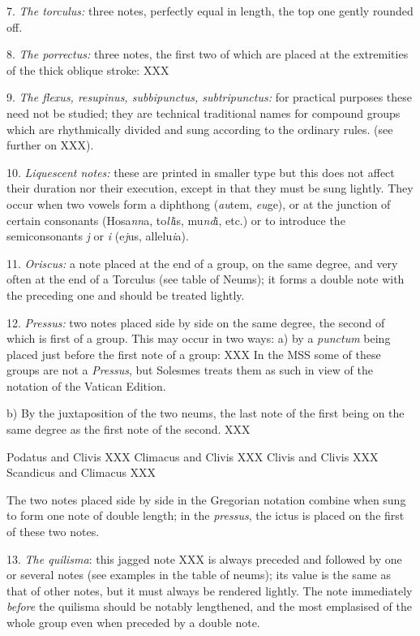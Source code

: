 7. {\it The torculus:} three notes, perfectly equal in length, the top one gently rounded off.

8. {\it The porrectus:} three notes, the first two of which are placed at the extremities of the thick oblique stroke:
XXX

9. {\it The flexus, resupinus, subbipunctus, subtripunctus:} for practical purposes these need not be studied; they are technical traditional names for compound groups which are rhythmically divided and sung according to the ordinary rules. (see further on XXX).

10. {\it Liquescent notes:} these are printed in smaller type but this does not affect their duration nor their execution, except in that they must be sung lightly. They occur when two vowels form a diphthong ({\it au}tem, {\it eu}ge), or at the junction of certain consonants (Hosa{\it nn}a, to{\it ll}is, mu{\it nd}i, etc.) or to introduce the semiconsonants {\it j} or {\it i} (e{\it j}us, allelu{\it i}a).

11. {\it Oriscus:} a note placed at the end of a group, on the same degree, and very often at the end of a Torculus (see table of Neums); it forms a double note with the preceding one and should be treated lightly.

12. {\it Pressus:} two notes placed side by side on the same degree, the second of which is first of a group. This may occur in two ways:
a) by a {\it punctum} being placed just before the first note of a group:
XXX
In the MSS some of these groups are not a {\it Pressus}, but Solesmes treats them as such in view of the notation of the Vatican Edition.

b) By the juxtaposition of the two neums, the last note of the first being on the same degree as the first note of the second.
XXX

Podatus and Clivis XXX
Climacus and Clivis XXX
Clivis and Clivis XXX
Scandicus and Climacus XXX

The two notes placed side by side in the Gregorian notation combine when sung to form one note of double length; in the {\it pressus}, the ictus is placed on the first of these two notes.

13. {\it The quilisma}: this jagged note XXX is always preceded and followed by one or several notes (see examples in the table of neums); its value is the same as that of other notes, but it must always be rendered lightly. The note immediately {\it before} the quilisma should be notably lengthened, and the most emplasised of the whole group even when preceded by a double note.

